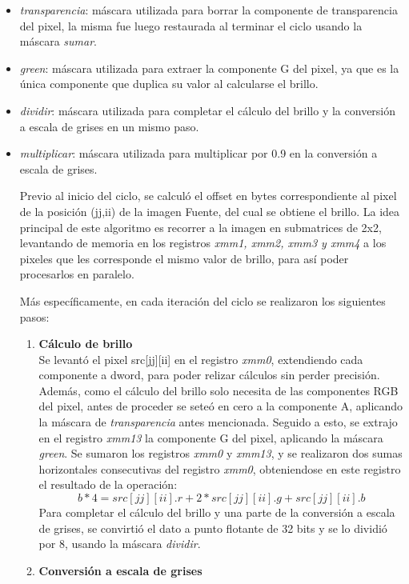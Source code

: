 \documentclass[a4paper]{article}
\begin{document}
\begin{itemize}
	\item \textit{transparencia}: máscara utilizada para borrar la componente de transparencia del pixel, la misma fue luego restaurada al terminar el ciclo usando la máscara \textit{sumar}.
	\item \textit{green}: máscara utilizada para extraer la componente G del pixel, ya que es la única componente que duplica su valor al calcularse el brillo.
	\item \textit{dividir}: máscara utilizada para completar el cálculo del brillo y la conversión a escala de grises en un mismo paso.
	\item \textit{multiplicar}: máscara utilizada para multiplicar por 0.9 en la conversión a escala de grises.
	
 Previo al inicio del ciclo, se calculó el offset en bytes correspondiente al pixel de la posición (jj,ii) de la imagen Fuente, del cual se obtiene el brillo. La idea principal de este algoritmo es recorrer a la imagen en submatrices de 2x2, levantando de memoria en los registros \textit{xmm1, xmm2, xmm3 y xmm4} a los pixeles que les corresponde el mismo valor de brillo, para así poder procesarlos en paralelo.
 
 
 Más específicamente, en cada iteración del ciclo se realizaron los siguientes pasos:
 
 \begin{enumerate}
 	\item \textbf{Cálculo de brillo}\\
 	Se levantó el pixel src[jj][ii] en el registro \textit{xmm0}, extendiendo cada componente a dword, para poder relizar cálculos sin perder precisión. Además, como el cálculo del  brillo solo necesita de las componentes RGB del pixel, antes de proceder se seteó en cero a la componente A, aplicando la máscara de \textit{transparencia} antes mencionada. Seguido a esto, se extrajo en el registro \textit{xmm13} la componente G del pixel, aplicando la máscara \textit{green}. Se sumaron los registros \textit{xmm0} y \textit{xmm13}, y se realizaron dos sumas horizontales consecutivas del registro \textit{xmm0}, obteniendose en este registro el resultado de la operación:
 	\begin{equation}
 	b*4 = src[jj][ii].r + 2 * src[jj][ii].g + src[jj][ii].b 
 	\end{equation}
 	Para completar el cálculo del brillo y una parte de la conversión a escala de grises, se convirtió el dato a punto flotante de 32 bits y se lo dividió por 8, usando la máscara \textit{dividir}.
 	
 	\item \textbf{Conversión a escala de grises}\\
 	
 	
 	
 	
 	
 	    
 \end{enumerate}
 
	
\end{itemize}	 
\end{document}
